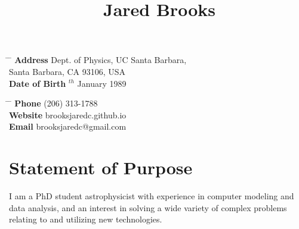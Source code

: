 \documentclass[10pt]{article} %
\begin{document}

\title{Jared Brooks} %


\parbox{0.5\textwidth}{ %
\begin{tabbing} %
\hspace{3cm} \= \hspace{4cm} \= \kill %
{\bf Address} \> Dept. of Physics, UC Santa Barbara,\\ %
\> Santa Barbara, CA 93106, USA \\ %
{\bf Date of Birth} $^{th}$ January 1989 \\ %
\end{tabbing}}
\hfill %
\parbox{0.5\textwidth}{ %
\begin{tabbing} %
\hspace{3cm} \= \hspace{4cm} \= \kill %
{\bf Phone} \> (206) 313-1788 \\ %
{\bf Website} \> brooksjaredc.github.io \\ %
{\bf Email} \> brooksjaredc@gmail.com \\ %
\end{tabbing}}


\section{Statement of Purpose}

I am a PhD student astrophysicist with experience in computer modeling and data analysis, and an interest in solving a wide variety of complex problems relating to and utilizing new technologies.

\end{document}
